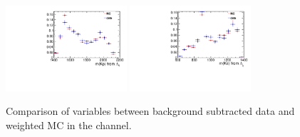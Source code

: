 \begin{figure}[bth]
\centering
\includegraphics[width=0.4\textwidth]{Figures/05_open_charm/04_tune/after_weight_kkpi/mkp.pdf}%
\includegraphics[width=0.4\textwidth]{Figures/05_open_charm/04_tune/after_weight_kkpi/mkpi.pdf}\\
	\caption{Comparison of variables between background subtracted data and weighted MC in the \LbLckkpi channel.}
\label{Fig.check_kkpi}
\end{figure}


